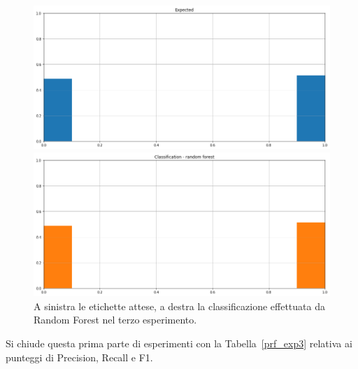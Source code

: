 \documentclass[12pt]{report}
\theoremstyle{definition}
\begin{document}
\begin{figure}
\centering
    \begin{minipage}{0.48\textwidth}
        \includegraphics[width=\linewidth]{images/experiment_beta05_disgiunti/expected_classification.png}
    \end{minipage}
    \begin{minipage}{0.48\textwidth}
        \includegraphics[width=\linewidth]{images/experiment_beta05_disgiunti/prediction_classification_rf.png}
    \end{minipage}
    \caption{A sinistra le etichette attese, a destra la classificazione effettuata da Random Forest nel terzo esperimento.}
    \label{rf_class_exp3}
\end{figure} 
Si chiude questa prima parte di esperimenti con la Tabella~\ref{prf_exp3} relativa ai punteggi di Precision, Recall e F1.
\end{document}
